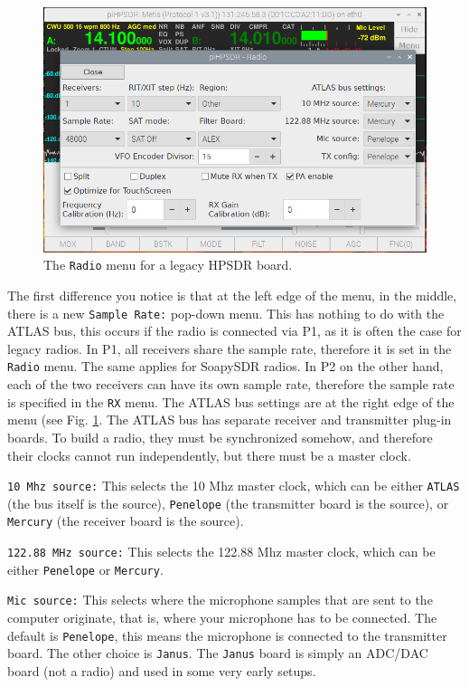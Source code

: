 \documentclass[12pt]{book}
\def\rett#1{\texttt{\color{red}#1}}
\def\bltt#1{\texttt{\color{blue}#1}}
\begin{document}
\begin{figure}[ht]
\center
\includegraphics[width=12cm]{RadioMenuMetis.png}
\caption{The \bltt{Radio} menu for a legacy HPSDR board.}
\label{fig:RadioMenuMetis}
\end{figure}

The first difference you notice is that at the left edge of the menu, in the middle,
there is a new \rett{Sample Rate:} pop-down menu. This has nothing to do with the
ATLAS bus, this occurs if the radio is connected via P1, as it is often the case for
legacy radios. In P1, all receivers share the sample rate, therefore it is set in the
\bltt{Radio} menu. The same applies for SoapySDR radios. In P2 on the other hand, each
of the two receivers can have its own sample rate, therefore the sample rate is specified
in the \bltt{RX} menu. The ATLAS bus settings are at the right edge of the menu (see Fig.
\ref{fig:RadioMenuMetis}. The ATLAS bus has separate receiver and transmitter plug-in boards.
To build a radio, they must be synchronized somehow, and therefore their clocks cannot run
independently, but there must be a master clock.

\rett{10 Mhz source:} This selects the 10 Mhz master clock, which can be either \texttt{ATLAS}
(the bus itself is the source), \texttt{Penelope} (the transmitter board is the source),
or \texttt{Mercury} (the receiver board is the source).

\rett{122.88 MHz source:} This selects the 122.88 Mhz master clock, which can be either
\texttt{Penelope} or \texttt{Mercury}.

\rett{Mic source:} This selects where the microphone samples that are sent to the computer
originate, that is, where your microphone has to be connected. The default is
\texttt{Penelope}, this means the microphone is connected to the transmitter board. The
other choice is \texttt{Janus}. The \texttt{Janus} board is simply an ADC/DAC board (not
a radio) and used in some very early setups.
\end{document}

